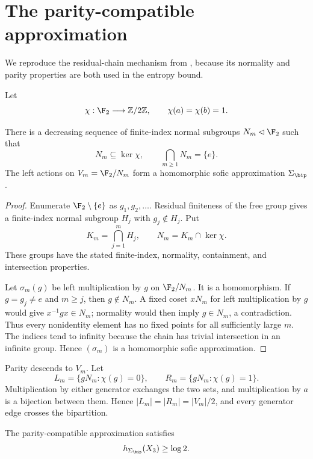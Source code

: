\section{The parity-compatible approximation}\label{sec:bip}

We reproduce the residual-chain mechanism from \citep{LiLiu2026}, because its
normality and parity properties are both used in the entropy bound.

Let
\[
 \chi:\F_2\longrightarrow\mathbb Z/2\mathbb Z,
 \qquad \chi(a)=\chi(b)=1.
\]

\begin{lemma}\label{lem:residual-chain}
There is a decreasing sequence of finite-index normal subgroups
$N_m\lhd\F_2$ such that
\[
 N_m\subseteq\ker\chi,
 \qquad \bigcap_{m\ge1}N_m=\{e\}.
\]
The left actions on $V_m=\F_2/N_m$ form a homomorphic sofic approximation
$\Sigma_{\bip}$.
\end{lemma}

\begin{proof}
Enumerate $\F_2\setminus\{e\}$ as $g_1,g_2,\ldots$.  Residual finiteness of
the free group gives a finite-index normal subgroup $H_j$ with
$g_j\notin H_j$.  Put
\[
 K_m=\bigcap_{j=1}^m H_j,
 \qquad N_m=K_m\cap\ker\chi.
\]
These groups have the stated finite-index, normality, containment, and
intersection properties.

Let $\sigma_m(g)$ be left multiplication by $g$ on $\F_2/N_m$.  It is a
homomorphism.  If $g=g_j\ne e$ and $m\ge j$, then $g\notin N_m$.  A fixed
coset $xN_m$ for left multiplication by $g$ would give
$x^{-1}gx\in N_m$; normality would then imply $g\in N_m$, a contradiction.
Thus every nonidentity element has no fixed points for all sufficiently
large $m$.  The indices tend to infinity because the chain has trivial
intersection in an infinite group.  Hence $(\sigma_m)$ is a homomorphic
sofic approximation.
\end{proof}

Parity descends to $V_m$.  Let
\[
 L_m=\{gN_m:\chi(g)=0\},\qquad
 R_m=\{gN_m:\chi(g)=1\}.
\]
Multiplication by either generator exchanges the two sets, and multiplication
by $a$ is a bijection between them.  Hence
$|L_m|=|R_m|=|V_m|/2$, and every generator edge crosses the bipartition.

\begin{proposition}\label{prop:bip-lower}
The parity-compatible approximation satisfies
\[
 h_{\Sigma_{\bip}}(X_3)\ge\log2.
\]
\end{proposition}

